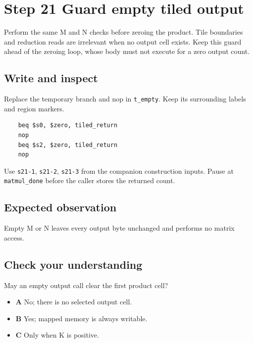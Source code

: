 \section{Step 21 Guard empty tiled output}\label{matmul-s21}

Perform the same M and N checks before zeroing the product. Tile boundaries and reduction reads are irrelevant when no output cell exists. Keep this guard ahead of the zeroing loop, whose body must not execute for a zero output count.

\subsection{Write and inspect}
Replace the temporary branch and nop in \texttt{t\_empty}. Keep its surrounding labels and region markers.

\begin{verbatim}
    beq $s0, $zero, tiled_return
    nop
    beq $s2, $zero, tiled_return
    nop
\end{verbatim}
Use \texttt{s21-1}, \texttt{s21-2}, \texttt{s21-3} from the companion construction inputs. Pause at \texttt{matmul\_done} before the caller stores the returned count.

\subsection{Expected observation}
Empty M or N leaves every output byte unchanged and performs no matrix access.

\subsection{Check your understanding}
May an empty output call clear the first product cell?

\begin{itemize}
  \item \textbf{A} No; there is no selected output cell.
  \item \textbf{B} Yes; mapped memory is always writable.
  \item \textbf{C} Only when K is positive.
\end{itemize}
